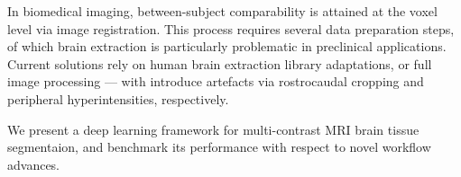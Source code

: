 In biomedical imaging, between-subject comparability is attained at the voxel level via image registration.
This process requires several data preparation steps, of which brain extraction is particularly problematic in preclinical applications.
Current solutions rely on human brain extraction library adaptations, or full image processing — with introduce artefacts via rostrocaudal cropping and peripheral hyperintensities, respectively.
\vspace{.8em}

We present a deep learning framework for multi-contrast MRI brain tissue segmentaion, and benchmark its performance with respect to novel workflow advances.